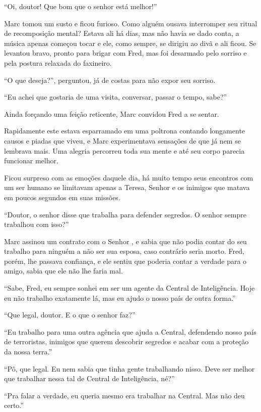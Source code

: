 ``Oi, doutor! Que bom que o senhor está melhor!''

Marc tomou um susto e ficou furioso. Como alguém ousava interromper seu
ritual de recomposição mental? Estava ali há dias, mas não havia se dado
conta, a música apenas começou tocar e ele, como sempre, se dirigiu ao
divã e ali ficou. Se levantou bravo, pronto para brigar com Fred, mas
foi desarmado pelo sorriso e pela postura relaxada do faxineiro.

``O que deseja?'', perguntou, já de costas para não expor seu sorriso.

``Eu achei que gostaria de uma visita, conversar, passar o tempo,
sabe?''

Ainda forçando uma feição reticente, Marc convidou Fred a se sentar.

Rapidamente este estava esparramado em uma poltrona contando
longamente causos e piadas que viveu, e Marc experimentava sensações de que
já nem se lembrava mais. Uma alegria percorreu toda sua mente e
até seu corpo parecia funcionar melhor.

Ficou surpreso com as emoções daquele dia, há muito tempo seus encontros
com um ser humano se limitavam apenas a Teresa, Senhor  e os inimigos
que matava em poucos segundos em suas missões.

``Doutor, o senhor disse que trabalha para defender segredos. O senhor
sempre trabalhou com isso?''

Marc assinou um contrato com o Senhor , e sabia que não podia
contar do seu trabalho para ninguém a não ser sua esposa, caso contrário
seria morto. Fred, porém, lhe passava confiança, e ele sentiu que poderia
contar a verdade para o amigo, sabia que ele não lhe faria mal.

``Sabe, Fred, eu sempre sonhei em ser um agente da Central de
Inteligência. Hoje eu não trabalho exatamente lá, mas eu ajudo o nosso
país de outra forma.''

``Que legal, doutor. E o que o senhor faz?''

``Eu trabalho para uma outra agência que ajuda a Central, defendendo
nosso país de terroristas, inimigos que querem descobrir segredos e
acabar com a proteção da nossa terra.''

``Pô, que legal. Eu nem sabia que tinha gente trabalhando nisso. Deve
ser melhor que trabalhar nessa tal de Central de Inteligência, né?''

``Pra falar a verdade, eu queria mesmo era trabalhar na Central. Mas não
deu certo.''

